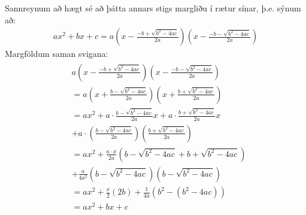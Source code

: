 \documentclass[a4paper,10pt,icelandic]{sphinxmanual}
\begin{document}
Sannreynum að hægt sé að þátta annars stigs margliðu í rætur sínar, þ.e. sýnum að:
\begin{equation*}
\begin{split}ax^2+bx+c=a\left(x-\frac{-b+\sqrt{b^2-4ac}}{2a}\right)\left(x-\frac{-b-\sqrt{b^2-4ac}}{2a}\right)\end{split}
\end{equation*}
Margföldum saman svigana:
\begin{equation*}
\begin{split}\begin{aligned}
        &a\left(x-\frac{-b+\sqrt{b^2-4ac}}{2a}\right)\left(x-\frac{-b-\sqrt{b^2-4ac}}{2a}  \right)\\
        &= a\left(x+\frac{b-\sqrt{b^2-4ac}}{2a}\right)\left(x+\frac{b+\sqrt{b^2-4ac}}{2a} \right)\\
        &=ax^2+a\cdot\frac{b-\sqrt{b^2-4ac}}{2a}x+a\cdot\frac{b+\sqrt{b^2-4ac}}{2a}x\\
        &+a\cdot\left(\frac{b-\sqrt{b^2-4ac}}{2a}\right)\left(\frac{b+\sqrt{b^2-4ac}}{2a}\right)\\
        &=ax^2 + \frac{a\cdot x}{2a}\left(b-\sqrt{b^2-4ac}+b+\sqrt{b^2-4ac}\right)\\
        &+\frac{a}{4a^2}\left(b-\sqrt{b^2-4ac}\right)\left(b-\sqrt{b^2-4ac}\right)\\
        &=ax^2+\frac{x}{2}(2b)+\frac{1}{4a}(b^2-(b^2-4ac)) \\
        &=ax^2+bx+c
\end{aligned}\end{split}
\end{equation*}
\end{document}
